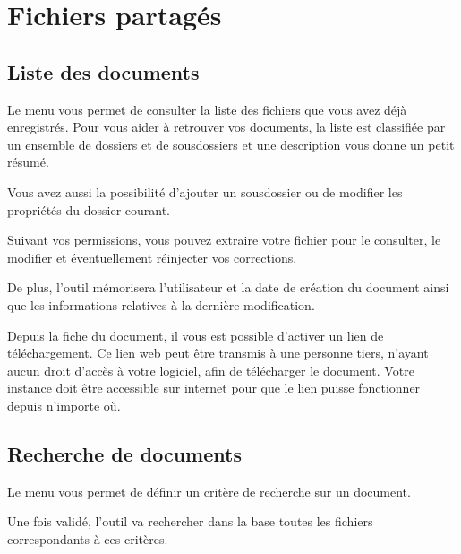 \documentclass[letterpaper,10pt,french]{sphinxmanual}
\begin{document}
\section{Fichiers partagés}
\label{\detokenize{documents/shared_document:fichiers-partages}}\label{\detokenize{documents/shared_document::doc}}

\subsection{Liste des documents}
\label{\detokenize{documents/shared_document:liste-des-documents}}
Le menu  vous permet de consulter la liste des fichiers que vous avez déjà enregistrés. Pour vous aider à retrouver vos documents, la liste est classifiée par un ensemble de dossiers et de sous\sphinxhyphen{}dossiers et une description vous donne un petit résumé.

Vous avez aussi la possibilité d’ajouter un sous\sphinxhyphen{}dossier ou de modifier les propriétés du dossier courant.

\noindent{}

Suivant vos permissions, vous pouvez extraire votre fichier pour le consulter, le modifier et éventuellement ré\sphinxhyphen{}injecter vos corrections.

De plus, l’outil mémorisera l’utilisateur et la date de création du document ainsi que les informations relatives à la dernière modification.

\noindent{}

Depuis la fiche du document, il vous est possible d’activer un lien de téléchargement.
Ce lien web peut être transmis à une personne tiers, n’ayant aucun droit d’accès à votre logiciel, afin de télécharger le document.
 Votre instance doit être accessible sur internet pour que le lien puisse fonctionner depuis n’importe où.


\subsection{Recherche de documents}
\label{\detokenize{documents/shared_document:recherche-de-documents}}
Le menu  vous permet de définir un critère de recherche sur un document.

Une fois validé, l’outil va rechercher dans la base toutes les fichiers correspondants à ces critères.
\end{document}
